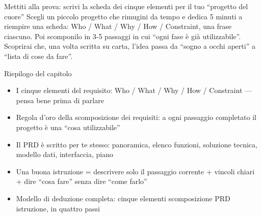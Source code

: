 \begin{tcbpractice}{Mettiti alla prova: scrivi la scheda dei cinque elementi per il tuo “progetto del cuore”}
Scegli un piccolo progetto che rimugini da tempo e dedica 5 minuti a riempire una scheda: Who / What / Why / How / Constraint, una frase ciascuno. Poi scomponilo in 3-5 passaggi in cui “ogni fase è già utilizzabile”. Scoprirai che, una volta scritta su carta, l'idea passa da “sogno a occhi aperti” a “lista di cose da fare”.

\end{tcbpractice}

\begin{tcbsummary}{Riepilogo del capitolo}
\begin{itemize}
  \item I cinque elementi del requisito: Who / What / Why / How / Constraint — pensa bene prima di parlare
  \item Regola d'oro della scomposizione dei requisiti: a ogni passaggio completato il progetto è una “cosa utilizzabile”
  \item Il PRD è scritto per te stesso: panoramica, elenco funzioni, soluzione tecnica, modello dati, interfaccia, piano
  \item Una buona istruzione = descrivere solo il passaggio corrente + vincoli chiari + dire “cosa fare” senza dire “come farlo”
  \item Modello di deduzione completa: cinque elementi scomposizione PRD istruzione, in quattro passi
\end{itemize}

\end{tcbsummary}
